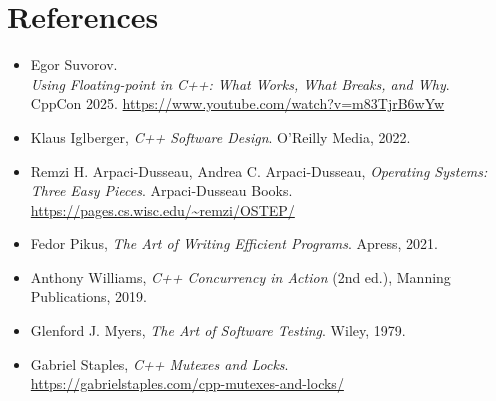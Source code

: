\documentclass{article}
\begin{document}
\section{References}
\begin{itemize}
    \item \label{ref:floating-point-cpp}
    Egor Suvorov.\\
    \emph{Using Floating-point in C++: What Works, What Breaks, and Why}.\\
    CppCon 2025.  
    \url{https://www.youtube.com/watch?v=m83TjrB6wYw}

    \item \label{ref:cpp-software-design}
    Klaus Iglberger, \emph{C++ Software Design}.
    O’Reilly Media, 2022.

    \item \label{ref:ostep}
    Remzi H. Arpaci-Dusseau, Andrea C. Arpaci-Dusseau,
    \emph{Operating Systems: Three Easy Pieces}.
    Arpaci-Dusseau Books.  
    \url{https://pages.cs.wisc.edu/~remzi/OSTEP/}
    
    \item \label{ref:pikus-efficient}
    Fedor Pikus, \emph{The Art of Writing Efficient Programs}.
    Apress, 2021.

    \item \label{ref:cpp-concurrency}
    Anthony Williams, \emph{C++ Concurrency in Action} (2nd ed.),
    Manning Publications, 2019.

    \item \label{ref:myers-testing}
    Glenford J. Myers,
    \emph{The Art of Software Testing}.
    Wiley, 1979.

    \item \label{ref:staples-mutexes}
    Gabriel Staples, \emph{C++ Mutexes and Locks}.\\
    \url{https://gabrielstaples.com/cpp-mutexes-and-locks/}
\end{itemize}
\end{document}
